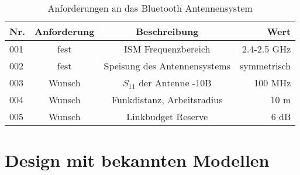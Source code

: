 
\begin{table}[!ht]
\centering
\begin{tabular}{lccr} \toprule 
Nr. & Anforderung & Beschreibung & Wert   \\ 
\midrule
001 & fest & ISM Frequenzbereich  & 2.4-2.5 GHz  \\ 
002 & fest &  Speisung des Antennensystems & symmetrisch  \\  
003 & Wunsch & $S_{11}$ der Antenne   -10B & 100 MHz  \\ 
004 & Wunsch & Funkdistanz, Arbeitsradius & 10 m   \\ 
005 & Wunsch & Linkbudget Reserve & 6 dB   \\ 
\bottomrule
  \end{tabular}
  \caption{Anforderungen an das Bluetooth Antennensystem}
  \label{AnforderungenAntenneSystem}
\end{table} 

\section{Design mit bekannten Modellen}

